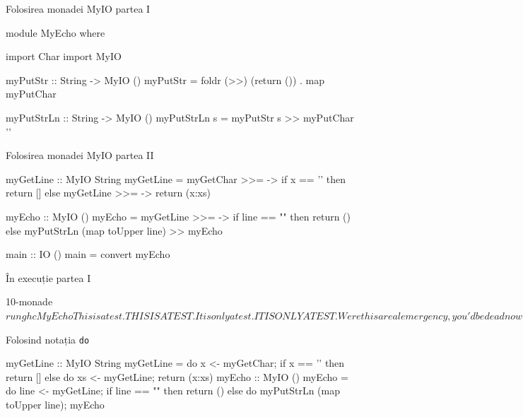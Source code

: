 \documentclass[xcolor=pdftex,romanian,colorlinks]{beamer}
\begin{document}
\begin{frame}[fragile]{Folosirea monadei MyIO}
{partea I}
\begin{asciihs}
  module MyEcho where

  import Char
  import MyIO

  myPutStr :: String -> MyIO ()
  myPutStr = foldr (>>) (return ()) . map myPutChar

  myPutStrLn :: String -> MyIO ()
  myPutStrLn s = myPutStr s >> myPutChar '\n'
\end{asciihs}
\end{frame}



\begin{frame}[fragile]{Folosirea monadei MyIO}
{partea II}
\vspace{-2ex}
\begin{asciihs}
  myGetLine :: MyIO String
  myGetLine = myGetChar >>= \x ->
               if x == '\n' then
                 return []
               else
                 myGetLine >>= \xs ->
                 return (x:xs)

  myEcho :: MyIO ()
  myEcho = myGetLine >>= \line ->
            if line == "" then
              return ()
            else
              myPutStrLn (map toUpper line) >>
              myEcho

  main :: IO ()
  main = convert myEcho
\end{asciihs}
\end{frame}



\begin{frame}[fragile]{În execuție}
{partea I}
\begin{asciihs}
  10-monade$ runghc MyEcho
  This is a test.
  THIS IS A TEST.
  It is only a test.
  IT IS ONLY A TEST.
  Were this a real emergency, you'd be dead now.
  WERE THIS A REAL EMERGENCY, YOU'D BE DEAD NOW.

  10-monade$
\end{asciihs}
\end{frame}

\begin{frame}[fragile]{Folosind notația \lstinline$do$}
\vspace{-2ex}
\begin{asciihs}
  myGetLine :: MyIO String
  myGetLine = do {
                 x <- myGetChar;
                 if x == '\n' then
                   return []
                 else do {
                   xs <- myGetLine;
                   return (x:xs)
                 }
               }
  myEcho :: MyIO ()
  myEcho = do {
              line <- myGetLine;
              if line == "" then
                return ()
              else do {
                myPutStrLn (map toUpper line);
                myEcho
              } }
\end{asciihs}
\end{frame}
\end{document}
